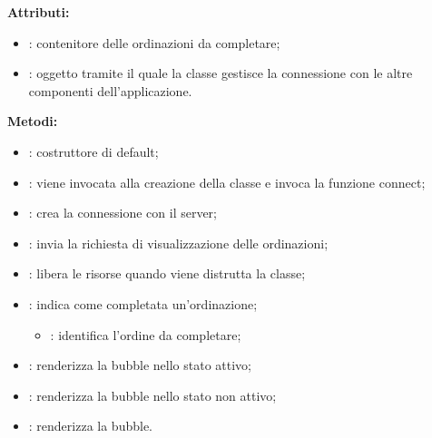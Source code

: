 \textbf{Attributi:}
\begin{itemize}
	\item {}: contenitore delle ordinazioni da completare;
	\item {}: oggetto tramite il quale la classe gestisce la connessione con le altre componenti dell'applicazione.
\end{itemize}

\textbf{Metodi:}
\begin{itemize}
	\item {}: costruttore di default;
	\item {}: viene invocata alla creazione della classe e invoca la funzione connect;
	\item {}: crea la connessione con il server;
	\item {}: invia la richiesta di visualizzazione delle ordinazioni;
	\item {}: libera le risorse quando viene distrutta la classe;
	\item {}: indica come completata un'ordinazione;
		\begin{itemize}
			\item {}: identifica l'ordine da completare;
		\end{itemize}
	\item {}: renderizza la bubble nello stato attivo;
	\item {}: renderizza la bubble nello stato non attivo;
	\item {}: renderizza la bubble.
\end{itemize}


